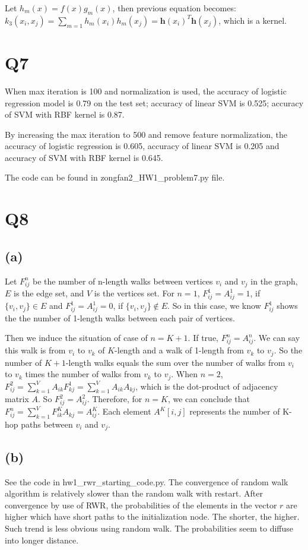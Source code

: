 \documentclass[]{article}
\begin{document}
Let $h_m(x)=f(x)g_m(x)$, then previous equation becomes:\\
$k_3(x_i,x_j)=\sum_{m=1}h_m(x_i)h_m(x_j)=\mathbf{h}(x_i)^T\mathbf{h}(x_j)$, which is a kernel.

\newpage
\section*{Q7}
When max iteration is 100 and normalization is used, the accuracy of logistic regression model is 0.79 on the test set; accuracy of linear SVM is 0.525; accuracy of SVM with RBF kernel is 0.87. 

By increasing the max iteration to 500 and remove feature normalization, the accuracy of logistic regression is 0.605, accuracy of linear SVM is 0.205 and accuracy of SVM with RBF kernel is 0.645.

The code can be found in zongfan2\_HW1\_problem7.py file.

\newpage


\section*{Q8}
\subsection*{(a)}
Let $F_{ij}^n$ be the number of n-length walks between vertices $v_i$ and $v_j$ in the graph, $E$ is the edge set, and $V$ is the vertices set. For $n=1$, $F^1_{ij}=A_{ij}^1=1$, if $\{v_i,v_j\}\in E$ and $F^1_{ij}=A_{ij}^1=0$, if $\{v_i,v_j\}\notin E$. So in this case, we know $F_{ij}^1$ shows the the number of 1-length walks between each pair of vertices. 

Then we induce the situation of case of $n=K+1$. If true, $F_{ij}^n=A_{ij}^n$. We can say this walk is from $v_i$ to $v_k$ of $K$-length and a walk of 1-length from $v_k$ to $v_j$. So the number of $K+1$-length walks equals the sum over the number of walks from $v_i$ to $v_k$ times the number of walks from $v_k$ to $v_j$.
When $n=2$, $F_{ij}^2=\sum_{k=1}^VA_{ik}F_{kj}^1=\sum_{k=1}^VA_{ik}A_{kj}$, which is the dot-product of adjacency matrix $A$. So $F_{ij}^2=A_{ij}^2$. 
Therefore, for $n=K$, we can conclude that $F_{ij}^n=\sum_{k=1}^VF_{ik}^KA_{kj}=A_{ij}^{K}$. Each element $A^K[i,j]$ represents the number of K-hop paths between $v_i$ and $v_j$. 

\subsection*{(b)}
See the code in hw1\_rwr\_starting\_code.py.
The convergence of random walk algorithm is relatively slower than the random walk with restart. After convergence by use of RWR, the probabilities of the elements in the vector $r$ are higher which have short paths to the initialization node. The shorter, the higher. Such trend is less obvious using random walk. The probabilities seem to diffuse into longer distance.  
\end{document}
